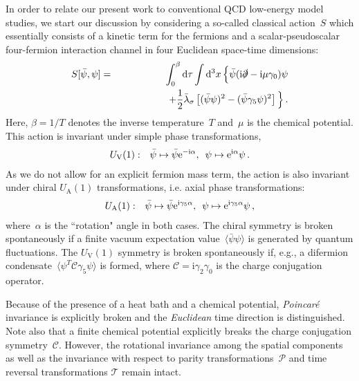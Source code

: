 \documentclass[prd,english,preprintnumbers,amsmath,amssymb,nofootinbib,twocolumn,superscriptaddress]{revtex4-1}
\def\CP{{\mathcal P}}
\def\CC{{\mathcal C}}
\def\CT{{\mathcal T}}
\newcommand{\E}{\mathrm{e}}
\newcommand{\I}{\mathrm{i}}
\newcommand{\be}{\begin{eqnarray}}
\newcommand{\ee}{\end{eqnarray}}
\newcommand{\del}{\partial}
\newcommand{\nn}{\nonumber }
\newcommand{\psib}{\bar{\psi}}
\begin{document}
{In order to relate our present work to conventional QCD low-energy model studies, we 
start our discussion by considering a so-called classical action~$S$ which essentially consists of a kinetic term for the
fermions and a scalar-pseudoscalar four-fermion interaction channel in four Euclidean space-time dimensions:
%
\be
S[\psib, \psi]&=& \int_0^\beta {\rm d} \tau \int {\rm d}^3 x\, \Big\{  \psib (\I \slashed \del - \I \mu \gamma_0 ) \psi \nn \\ 
&&\qquad\qquad\quad + \frac{1}{2}\bar \lambda_\sigma  \left[ (\psib \psi )^2 - (\psib \gamma_5 \psi)^2 \right]
\Big\}\,.
\label{eq:S}
\ee
%
Here, $\beta = 1/T$ denotes the inverse temperature~$T$ and~$\mu$ is the chemical potential.
This action is invariant under simple phase transformations,
%
\be
U_\text V (1) &:& \psib \mapsto  \psib \E^{-\I \alpha}, \enspace \psi\mapsto \E^{ \I \alpha} \psi\,.
\ee
%
As we do not allow for an explicit fermion mass term, the action is also invariant under 
chiral $U_{\text{A}}(1)$ transformations, i.e. axial phase transformations:
%
\be
U_\text A (1) &:&  \psib \mapsto \psib  \E^{ \I \gamma_5 \alpha}, \enspace  \psi \mapsto \E^{ \I \gamma_5 \alpha} \psi\,,
\ee
%
where~$\alpha$ is the ``rotation" angle in both cases. The chiral symmetry is broken spontaneously if a finite vacuum 
expectation value~$\langle\bar{\psi}\psi\rangle$ is generated by quantum fluctuations.
The $U_{\text{V}}(1)$ symmetry is broken spontaneously if, e.g., a difermion
condensate~$\langle \psi^{T}\CC\gamma_5\psi\rangle$ is formed, where $\CC=\I \gamma_2\gamma_0$ is the charge
conjugation operator.

Because of the presence of a heat bath and a chemical potential, {\it Poincar\'e} invariance is explicitly broken and the {\it Euclidean} time 
direction is distinguished. Note also that a finite chemical potential {explicitly breaks the charge} conjugation symmetry~$\CC$. 
However, the rotational invariance among the spatial components  
as well as  
the invariance
with respect to parity transformations~$\CP$ and time reversal transformations $\CT$ remain intact. 

}
\end{document}
